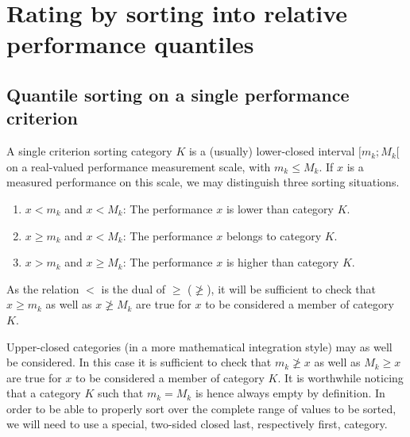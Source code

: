 \chapter{Rating by sorting into relative performance quantiles}
\label{sec:9}



\section{Quantile sorting on a single performance criterion}
\label{sec:9.1}

A single criterion sorting category $K$ is a (usually) lower-closed interval $[m_k ; M_k[$ on a real-valued performance measurement scale, with $m_k \leq M_k$. If $x$ is a measured performance on this scale, we may distinguish three sorting situations.
\begin{enumerate}[leftmargin=1cm,rightmargin=0.5cm,topsep=1pt]
\item $x < m_k$ and $x < M_k$: The performance $x$ is lower than category $K$.
\item $x \geqslant m_k$ and $x < M_k$: The performance $x$ belongs to category $K$.
\item $x > m_k$ and $x \geqslant M_k$: The performance $x$ is higher than category $K$.
\end{enumerate}

As the relation $<$ is the dual of $\geqslant$ ($\not\geqslant$), it will be sufficient to check that $x \geqslant m_k$ as well as $x \not\geqslant M_k$ are true for $x$ to be considered a member of category $K$.

Upper-closed categories (in a more mathematical integration style) may as well be considered. In this case it is sufficient to check that $m_k \not\geqslant x$ as well as $M_k \geq x$ are true for $x$ to be considered a member of category $K$. It is worthwhile noticing that a category $K$ such that $m_k = M_k$ is hence always empty by definition. In order to be able to properly sort over the complete range of values to be sorted, we will need to use a special, two-sided closed last, respectively first, category.

